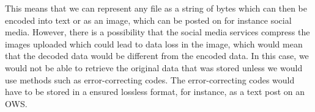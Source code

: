 This means that we can represent any file as a string of bytes which can then be encoded into text or as an image, which can be posted on for instance social media. However, there is a possibility that the social media services compress the images uploaded which could lead to data loss in the image, which would mean that the decoded data would be different from the encoded data. In this case, we would not be able to retrieve the original data that was stored unless we would use methods such as \mbox{error-correcting} codes. The \mbox{error-correcting} codes would have to be stored in a ensured lossless format, for instance, as a text post on an \gls{OWS}.